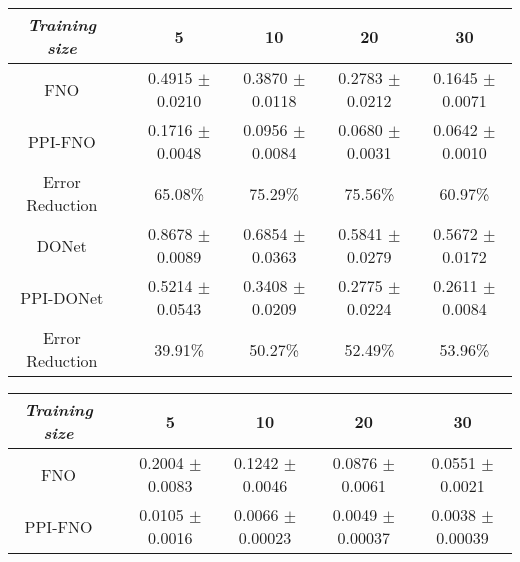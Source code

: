 \begin{table*}[t]
    \small
    \centering
    \begin{subtable}{\textwidth}
        \small 
        \centering
    \begin{tabular}{cccccc}
        \hline
        \textit{Training size}      &  & {5}             & {10}         & {20}     & {30}     \\ \hline
        FNO                  &  & 0.4915 $\pm$ 0.0210	& 0.3870 $\pm$ 0.0118   & 0.2783 $\pm$ 0.0212   & 0.1645 $\pm$ 0.0071         \\
        PPI-FNO          &  & {0.1716} $\pm$ {0.0048}          & {0.0956} $\pm$ {0.0084}        & {0.0680} $\pm$ {0.0031} 		 & {0.0642} $\pm$ {0.0010}    \\
        Error Reduction          &  & 65.08\% & 75.29\%        & 75.56\%		 & 60.97\%   \\ \hline
        DONet             &  & 0.8678 $\pm$ 0.0089          & 0.6854 $\pm$ 0.0363      & 0.5841 $\pm$ 0.0279 	& 0.5672 $\pm$ 0.0172    \\
        PPI-DONet             &  & 0.5214 $\pm$ 0.0543        & 0.3408 $\pm$ 0.0209    	& 0.2775 $\pm$ 0.0224	& 0.2611 $\pm$ 0.0084  \\ 
        Error Reduction  &  & 39.91\%         & 50.27\%    	& 52.49\%	& 53.96\%  \\ \hline
    \end{tabular}
    \caption{\small \textit{Darcy flow}}
    \label{tab:darcy}
    \end{subtable}
    \begin{subtable}{\textwidth}
        \small
        \centering
        \begin{tabular}{cccccc}
        \hline
        \textit{Training size}      &  & {5}             & {10}         & {20}     & {30}     \\ \hline
        FNO                  &  & 0.2004 $\pm$ 0.0083	& 0.1242 $\pm$ 0.0046   & 0.0876 $\pm$ 0.0061   & 0.0551 $\pm$ 0.0021         \\
        PPI-FNO          &  & 0.0105 $\pm$ 0.0016         & 0.0066 $\pm$ 0.00023        & 0.0049 $\pm$ 0.00037 		 & 0.0038 $\pm$ 0.00039    \\

\end{tabular}
\end{subtable}
\end{table*}
